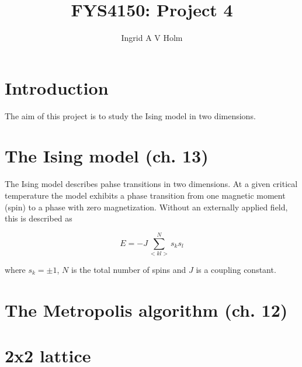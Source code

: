 \documentclass[11pt]{article}
\begin{document}
\title{FYS4150: Project 4}
\author{Ingrid A V Holm}
\maketitle


\section{Introduction}

\begin{flushleft}
The aim of this project is to study the Ising model in two dimensions.
\end{flushleft}

\section{The Ising model (ch. 13)}

\begin{flushleft}
The Ising model describes pahse transitions in two dimensions. At a given critical temperature the model exhibits a phase transition from one magnetic moment (spin) to a phase with zero magnetization. Without an externally applied field, this is described as

\begin{equation}
E = -J \sum^N_{<kl>} s_k s_l
\end{equation}

where $s_k = \pm 1$, $N$ is the total number of spins and $J$ is a coupling constant.
\end{flushleft}

\section{The Metropolis algorithm (ch. 12)}

\begin{flushleft}

\end{flushleft}


\section{2x2 lattice}
\end{document}
